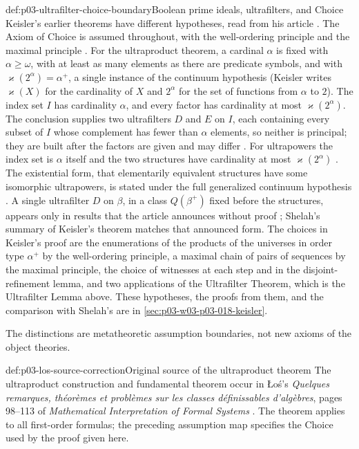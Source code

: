 \begin{proofboundary}{def:p03-ultrafilter-choice-boundary}{Boolean prime ideals, ultrafilters, and Choice}
Keisler's earlier theorems have different hypotheses, read from his article
\cite{Keisler1961ElementaryClasses}.  The Axiom of Choice is assumed
throughout, with the well-ordering principle and the maximal principle
\cite[479]{Keisler1961ElementaryClasses}.  For the ultraproduct theorem, a
cardinal \(\alpha\) is fixed with \(\alpha\ge\omega\), with at least as many
elements as there are predicate symbols, and with
\(\varkappa(2^\alpha)=\alpha^+\), a single instance of the continuum
hypothesis (Keisler writes \(\varkappa(X)\) for the cardinality of \(X\) and
\(2^\alpha\) for the set of functions from \(\alpha\) to \(2\)).  The index set \(I\) has cardinality \(\alpha\), and every factor
has cardinality at most \(\varkappa(2^\alpha)\).  The conclusion supplies two
ultrafilters \(D\) and \(E\) on \(I\), each containing every subset of \(I\)
whose complement has fewer than \(\alpha\) elements, so neither is principal;
they are built after the factors are given and may differ
\cite[484--486]{Keisler1961ElementaryClasses}.  For ultrapowers the index set
is \(\alpha\) itself and the two structures have cardinality at most
\(\varkappa(2^\alpha)\) \cite[486]{Keisler1961ElementaryClasses}.  The
existential form, that elementarily equivalent structures have some
isomorphic ultrapowers, is stated under the full generalized continuum
hypothesis \cite[487]{Keisler1961ElementaryClasses}.  A single ultrafilter
\(D\) on \(\beta\), in a class \(Q(\beta^+)\) fixed before the structures,
appears only in results that the article announces without proof
\cite[490--492]{Keisler1961ElementaryClasses}; Shelah's summary of Keisler's
theorem \cite[224]{Shelah1971Ultrapowers} matches that announced form.  The
choices in Keisler's proof are the enumerations of the products of the
universes in order type \(\alpha^+\) by the well-ordering principle, a maximal
chain of pairs of sequences by the maximal principle, the choice of witnesses
at each step and in the disjoint-refinement lemma, and two applications of
the Ultrafilter Theorem, which is the Ultrafilter Lemma above.  These
hypotheses, the proofs from them, and the comparison with Shelah's are in
\cref{sec:p03-w03-p03-018-keisler}.


The distinctions are metatheoretic assumption boundaries, not new axioms of
the object theories.
\end{proofboundary}

\begin{proofboundary}{def:p03-los-source-correction}{Original source of the ultraproduct theorem}
The ultraproduct construction and fundamental theorem occur in
\L o\'s's \emph{Quelques remarques, th\'eor\`emes et probl\`emes
sur les classes d\'efinissables d'alg\`ebres}, pages 98--113 of
\emph{Mathematical Interpretation of Formal Systems}
\cite{Los1955Ultraproducts}. The theorem applies to all first-order formulas;
the preceding assumption map specifies the Choice used by the proof given here.
\end{proofboundary}

